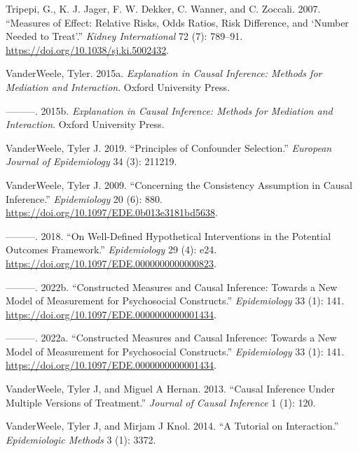 \documentclass[
  singlecolumn]{report}
\newlength{\cslhangindent}
\newlength{\cslentryspacingunit} %
\newenvironment{CSLReferences}[2] %
 {%
  \setlength{\parindent}{0pt}
  \ifodd #1
  \let\oldpar\par
  \def\par{\hangindent=\cslhangindent\oldpar}
  \fi
  \setlength{\parskip}{#2\cslentryspacingunit}
 }%
 {}
\begin{document}
\begin{CSLReferences}{1}{0}
\leavevmode{}%
Tripepi, G., K. J. Jager, F. W. Dekker, C. Wanner, and C. Zoccali. 2007.
{``Measures of Effect: Relative Risks, Odds Ratios, Risk Difference, and
{`}Number Needed to Treat{'}.''} \emph{Kidney International} 72 (7):
789--91. \url{https://doi.org/10.1038/sj.ki.5002432}.

\leavevmode{}%
VanderWeele, Tyler. 2015a. \emph{Explanation in Causal Inference:
Methods for Mediation and Interaction}. Oxford University Press.

\leavevmode{}%
---------. 2015b. \emph{Explanation in Causal Inference: Methods for
Mediation and Interaction}. Oxford University Press.

\leavevmode{}%
VanderWeele, Tyler J. 2019. {``Principles of Confounder Selection.''}
\emph{European Journal of Epidemiology} 34 (3): 211219.

\leavevmode{}%
VanderWeele, Tyler J. 2009. {``Concerning the Consistency Assumption in
Causal Inference.''} \emph{Epidemiology} 20 (6): 880.
\url{https://doi.org/10.1097/EDE.0b013e3181bd5638}.

\leavevmode{}%
---------. 2018. {``On Well-Defined Hypothetical Interventions in the
Potential Outcomes Framework.''} \emph{Epidemiology} 29 (4): e24.
\url{https://doi.org/10.1097/EDE.0000000000000823}.

\leavevmode{}%
---------. 2022b. {``Constructed Measures and Causal Inference: Towards
a New Model of Measurement for Psychosocial Constructs.''}
\emph{Epidemiology} 33 (1): 141.
\url{https://doi.org/10.1097/EDE.0000000000001434}.

\leavevmode{}%
---------. 2022a. {``Constructed Measures and Causal Inference: Towards
a New Model of Measurement for Psychosocial Constructs.''}
\emph{Epidemiology} 33 (1): 141.
\url{https://doi.org/10.1097/EDE.0000000000001434}.

\leavevmode{}%
VanderWeele, Tyler J, and Miguel A Hernan. 2013. {``Causal Inference
Under Multiple Versions of Treatment.''} \emph{Journal of Causal
Inference} 1 (1): 120.

\leavevmode{}%
VanderWeele, Tyler J, and Mirjam J Knol. 2014. {``A Tutorial on
Interaction.''} \emph{Epidemiologic Methods} 3 (1): 3372.


\end{CSLReferences}
\end{document}
